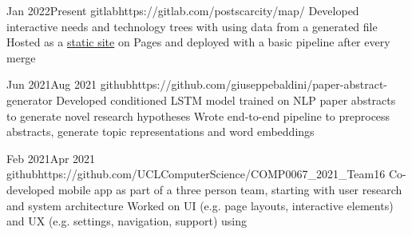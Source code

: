 

       {Jan 2022}{Present}
{gitlab}{https://gitlab.com/postscarcity/map/}
{Developed interactive needs and technology trees with  using data from a generated  file}
{Hosted as a \href{https://postscarcitymap.org/}{static site} on  Pages and deployed with a basic  pipeline after every  merge}


      {Jun 2021}{Aug 2021}
{github}{https://github.com/giuseppebaldini/paper-abstract-generator}
{Developed conditioned LSTM model trained on NLP paper abstracts to generate novel research hypotheses}
{Wrote end-to-end pipeline to preprocess abstracts, generate topic representations and word embeddings}


              {Feb 2021}{Apr 2021}
{github}{https://github.com/UCLComputerScience/COMP0067_2021_Team16}
{Co-developed mobile app as part of a three person team, starting with user research and system architecture}
{Worked on UI (e.g. page layouts, interactive elements) and UX (e.g. settings, navigation, support) using }
